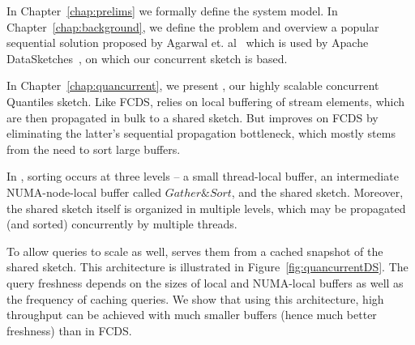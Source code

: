 In Chapter~\ref{chap:prelims} we formally define the system model. In Chapter~\ref{chap:background}, we define the problem and overview a popular sequential solution proposed by Agarwal et. al~\cite{mergeables_summaries} which is used by Apache DataSketches~\cite{DataSketches}, on which our concurrent sketch is based.


In Chapter~\ref{chap:quancurrent}, we present \mysketch, our highly scalable concurrent Quantiles sketch.
Like FCDS, \mysketch relies on local buffering of stream elements, which are then propagated in bulk to a shared sketch.
But \mysketch improves on FCDS by eliminating the latter's sequential propagation bottleneck, which mostly stems from the need to sort large buffers.

In \mysketch, sorting occurs at three levels – a small thread-local buffer, an intermediate \acrshort{NUMA}-node-local buffer called $\mathit{Gather\&Sort}$, and the shared sketch.
Moreover, the shared sketch itself is organized in multiple levels, which may be propagated (and sorted) concurrently by multiple threads.

To allow queries to scale as well, \mysketch serves them from a cached snapshot of the shared sketch.
This architecture is illustrated in Figure~\ref{fig:quancurrentDS}.
The query freshness depends on the sizes of local and NUMA-local buffers as well as the frequency of caching queries.
We show that using this architecture, high throughput can be achieved with much smaller buffers (hence much better freshness) than in FCDS.



